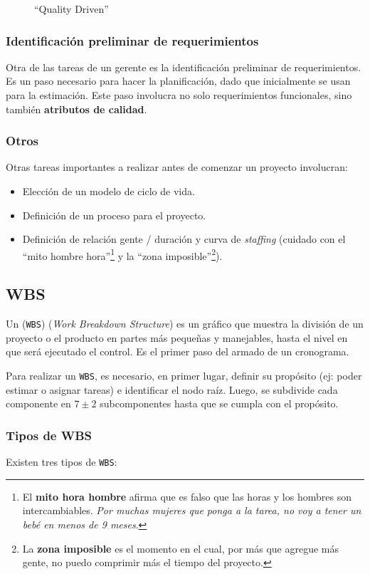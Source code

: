 \documentclass[]{article}
\begin{document}
\begin{figure}[!htb]
  \caption{``Quality Driven''}
\endminipage
\end{figure}

\subsubsection{Identificación preliminar de requerimientos}
Otra de las tareas de un gerente es la identificación preliminar de requerimientos. Es un paso necesario para hacer la planificación, dado que inicialmente se usan para la estimación. Este paso involucra no solo requerimientos funcionales, sino también \textbf{atributos de calidad}.


\subsubsection{Otros}
Otras tareas importantes a realizar antes de comenzar un proyecto involucran:
\begin{itemize}
	\item Elección de un modelo de ciclo de vida.
	\item Definición de un proceso para el proyecto.
	\item Definición de relación gente / duración y curva de \emph{staffing} (cuidado con el ``mito hombre hora''\footnote{El \textbf{mito hora hombre} afirma que es falso que las horas y los hombres son intercambiables. \emph{Por muchas mujeres que ponga a la tarea, no voy a tener un bebé en menos de 9 meses}.} y la ``zona imposible''\footnote{La \textbf{zona imposible} es el momento en el cual, por más que agregue más gente, no puedo comprimir más el tiempo del proyecto.}).
\end{itemize}

\subsection{WBS}
Un (\texttt{WBS}) (\emph{Work Breakdown Structure}) es un gráfico que muestra la división de un proyecto o el producto en partes más pequeñas y manejables, hasta el nivel en que será ejecutado el control. Es el primer paso del armado de un cronograma.

Para realizar un \texttt{WBS}, es necesario, en primer lugar, definir su propósito (ej: poder estimar o asignar tareas) e identificar el nodo raíz. Luego, se subdivide cada componente en $7\pm2$ subcomponentes hasta que se cumpla con el propósito.

\subsubsection{Tipos de WBS}
Existen tres tipos de \texttt{WBS}:
\end{document}
